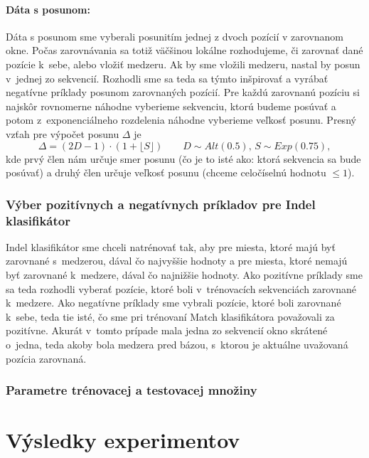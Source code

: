 \paragraph{Dáta s posunom:} Dáta s posunom sme vyberali posunitím jednej z dvoch pozícií v zarovnanom okne.
Počas zarovnávania sa totiž väčšinou lokálne rozhodujeme, či zarovnať dané pozície k~sebe, alebo vložiť medzeru. Ak by sme vložili medzeru, nastal by posun v~jednej zo sekvencií. Rozhodli sme sa teda sa týmto inšpirovať a vyrábať negatívne príklady posunom zarovnaných pozícií. Pre každú zarovnanú pozíciu si najskôr rovnomerne náhodne vyberieme sekvenciu, ktorú budeme posúvať a potom z~exponenciálneho rozdelenia náhodne vyberieme veľkosť posunu. Presný vzťah pre výpočet posunu $\Delta$ je
$$\Delta = \left(2D-1\right)\cdot \left(1+\lfloor S\rfloor\right)\qquad D\sim Alt(0.5),\, S\sim Exp(0.75),$$
kde prvý člen nám určuje smer posunu (čo je to isté ako: ktorá sekvencia sa bude posúvať) a druhý člen určuje veľkosť posunu (chceme celočíselnú hodnotu $\leq 1$).

\subsubsection{Výber pozitívnych a negatívnych príkladov pre Indel klasifikátor}

Indel klasifikátor sme chceli natrénovať tak, aby pre miesta, ktoré majú byť zarovnané s~medzerou, dával čo najvyššie hodnoty a pre miesta, ktoré nemajú byť zarovnané k~medzere, dával čo najnižšie hodnoty. Ako pozitívne príklady sme sa teda rozhodli vyberať pozície, ktoré boli v~trénovacích sekvenciách zarovnané k~medzere. Ako negatívne príklady sme vybrali pozície, ktoré boli zarovnané k~sebe, teda tie isté, čo sme pri trénovaní Match klasifikátora považovali za pozitívne. Akurát v~tomto prípade mala jedna zo sekvencií okno skrátené o~jedna, teda akoby bola medzera pred bázou, s~ktorou je aktuálne uvažovaná pozícia zarovnaná.

\subsubsection{Parametre trénovacej a testovacej množiny}

\todo

\section{Výsledky experimentov}


